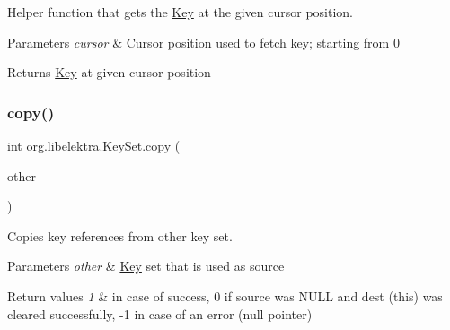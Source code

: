Helper function that gets the \hyperlink{classorg_1_1libelektra_1_1Key}{Key} at the given cursor position. 


\begin{DoxyParams}{Parameters}
{\em cursor} & Cursor position used to fetch key; starting from 0 \\
\hline
\end{DoxyParams}
\begin{DoxyReturn}{Returns}
\hyperlink{classorg_1_1libelektra_1_1Key}{Key} at given cursor position 
\end{DoxyReturn}
\mbox{\label{classorg_1_1libelektra_1_1KeySet_a32cba0dbe638373296fb242a698ad1cb}} 
\subsubsection{\texorpdfstring{copy()}{copy()}}
{\footnotesize\ttfamily int org.\+libelektra.\+Key\+Set.\+copy (\begin{DoxyParamCaption}\item[{final \hyperlink{classorg_1_1libelektra_1_1KeySet}{Key\+Set}}]{other }\end{DoxyParamCaption})\hspace{0.3cm}{\ttfamily [inline]}}



Copies key references from other key set. 


\begin{DoxyParams}{Parameters}
{\em other} & \hyperlink{classorg_1_1libelektra_1_1Key}{Key} set that is used as source \\
\hline
\end{DoxyParams}

\begin{DoxyRetVals}{Return values}
{\em 1} & in case of success, 0 if source was N\+U\+LL and dest (this) was cleared successfully, -\/1 in case of an error (null pointer) \\
\hline
\end{DoxyRetVals}
\mbox{\label{classorg_1_1libelektra_1_1KeySet_ae3f1cd9ac1a4fd2ef7d16e6c320bc6a3}} 
